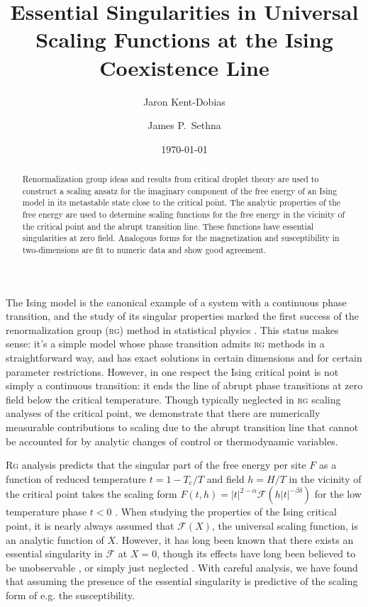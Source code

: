\documentclass[aps,prl,reprint]{revtex4-1}
\def\c{\mathrm c}
\def\fF{\mathcal F}  %
\begin{document}
\title{Essential Singularities in Universal Scaling Functions at the Ising Coexistence Line}
\author{Jaron Kent-Dobias}
\author{James P.~Sethna}

\date\today

\begin{abstract}
  Renormalization group ideas and results from critical droplet theory are
  used to construct a scaling ansatz for the imaginary component of the free
  energy of an Ising model in its metastable state close to the critical
  point. The analytic properties of the free energy are used to determine
  scaling functions for the free energy in the vicinity of the
  critical point and the abrupt transition line. These functions have
  essential singularities at zero field. Analogous forms for the magnetization
  and susceptibility in two-dimensions are fit to numeric data and show good
  agreement.
\end{abstract}

\maketitle

The Ising model is the canonical example of a system with a continuous phase
transition, and the study of its singular properties marked the first success
of the renormalization group (\textsc{rg}) method in statistical physics
\cite{wilson.1971.renormalization}. This status makes sense: it's a simple
model whose phase transition admits \textsc{rg} methods in a straightforward way,
and has exact solutions in certain dimensions and for certain parameter
restrictions. However, in one respect the Ising critical point is not simply a
continuous transition: it ends the line of abrupt phase transitions at zero
field below the critical temperature. Though typically neglected in \textsc{rg}
scaling analyses of the critical point, we demonstrate that there are
numerically measurable contributions to scaling due to the abrupt transition
line that cannot be accounted for by analytic changes of control or
thermodynamic variables.

\textsc{Rg} analysis predicts that the singular part of the free energy per
site $F$ as a function of reduced temperature $t=1-T_\c/T$ and field $h=H/T$ in
the vicinity of the critical point takes the scaling form
$F(t,h)=|t|^{2-\alpha}\fF(h|t|^{-\beta\delta})$ for the low temperature phase $t<0$ \cite{cardy.1996.scaling,aharony.1983.fields}. When studying the properties of
the Ising critical point, it is nearly always assumed that $\fF(X)$,
the universal scaling function, is an analytic function of $X$. However, it
has long been known that there exists an essential singularity in $\fF$
at $X=0$, though its effects have long been believed to be unobservable
\cite{fisher.1967.condensation}, or simply just neglected
\cite{guida.1997.3dising,schofield.1969.parametric,schofield.1969.correlation,caselle.2001.critical,josephson.1969.equation,fisher.1999.trigonometric}.
With careful analysis, we have found that assuming the presence of the
essential singularity is predictive of the scaling form of e.g. the
susceptibility.
\end{document}
